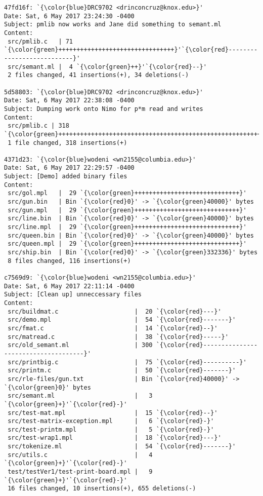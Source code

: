 \begin{lstlisting}
47fd16f: `{\color{blue}DRC9702 <drinconcruz@knox.edu>}'
Date: Sat, 6 May 2017 23:24:30 -0400
Subject: pmlib now works and Jane did something to semant.ml
Content: 
 src/pmlib.c   | 71 `{\color{green}++++++++++++++++++++++++++++++++}'`{\color{red}---------------------------}'
 src/semant.ml |  4 `{\color{green}++}'`{\color{red}--}'
 2 files changed, 41 insertions(+), 34 deletions(-)

5d58803: `{\color{blue}DRC9702 <drinconcruz@knox.edu>}'
Date: Sat, 6 May 2017 22:38:08 -0400
Subject: Dumping work onto Nimo for p*m read and writes
Content: 
 src/pmlib.c | 318 `{\color{green}++++++++++++++++++++++++++++++++++++++++++++++++++++++++++++}'
 1 file changed, 318 insertions(+)

4371d23: `{\color{blue}wodeni <wn2155@columbia.edu>}'
Date: Sat, 6 May 2017 22:29:57 -0400
Subject: [Demo] added binary files
Content: 
 src/gol.mpl   |  29 `{\color{green}+++++++++++++++++++++++++++++}'
 src/gun.bin   | Bin `{\color{red}0}' -> `{\color{green}40000}' bytes
 src/gun.mpl   |  29 `{\color{green}+++++++++++++++++++++++++++++}'
 src/line.bin  | Bin `{\color{red}0}' -> `{\color{green}40000}' bytes
 src/line.mpl  |  29 `{\color{green}+++++++++++++++++++++++++++++}'
 src/queen.bin | Bin `{\color{red}0}' -> `{\color{green}40000}' bytes
 src/queen.mpl |  29 `{\color{green}+++++++++++++++++++++++++++++}'
 src/ship.bin  | Bin `{\color{red}0}' -> `{\color{green}332336}' bytes
 8 files changed, 116 insertions(+)

c7569d9: `{\color{blue}wodeni <wn2155@columbia.edu>}'
Date: Sat, 6 May 2017 22:11:14 -0400
Subject: [Clean up] unneccessary files
Content: 
 src/buildmat.c                     |  20 `{\color{red}---}'
 src/demo.mpl                       |  54 `{\color{red}-------}'
 src/fmat.c                         |  14 `{\color{red}--}'
 src/matread.c                      |  38 `{\color{red}-----}'
 src/old_semant.ml                  | 300 `{\color{red}-------------------------------------}'
 src/printbig.c                     |  75 `{\color{red}----------}'
 src/printm.c                       |  50 `{\color{red}-------}'
 src/rle-files/gun.txt              | Bin `{\color{red}40000}' -> `{\color{green}0}' bytes
 src/semant.ml                      |   3 `{\color{green}+}'`{\color{red}-}'
 src/test-mat.mpl                   |  15 `{\color{red}--}'
 src/test-matrix-exception.mpl      |   6 `{\color{red}-}'
 src/test-printm.mpl                |   5 `{\color{red}-}'
 src/test-wrap1.mpl                 |  18 `{\color{red}---}'
 src/tokenize.ml                    |  54 `{\color{red}-------}'
 src/utils.c                        |   4 `{\color{green}+}'`{\color{red}-}'
 test/testVer1/test-print-board.mpl |   9 `{\color{green}+}'`{\color{red}-}'
 16 files changed, 10 insertions(+), 655 deletions(-)


\end{lstlisting}
